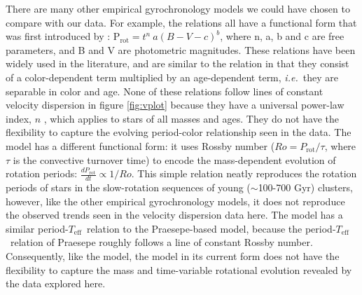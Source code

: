 \documentclass{aastex63}
\newcommand{\ie}{{\it i.e.}}
\newcommand{\teff}{$T_{\mathrm{eff}}$}
\begin{document}
{There are many other empirical gyrochronology models we could have chosen to
compare with our data.
For example, the \citet{barnes2003, barnes2007, mamajek2008, meibom2011,
angus2015} relations all have a functional form that was first introduced by
\citet{barnes2003}: $\mathrm{P_{rot}} = t^n~a(B-V - c)^b$, where n, a, b and c
are free parameters, and B and V are photometric magnitudes.
These relations have been widely used in the literature, and are similar to
the \citet{angus2019} relation in that they consist of a color-dependent term
multiplied by an age-dependent term, \ie\ they are separable in color and age.
None of these relations follow lines of constant velocity dispersion in figure
\ref{fig:vplot} because they have a universal power-law index, $n$
\citep[$\approx$ 0.5,][]{skumanich1972}, which applies to stars of all masses
and ages.
They do not have the flexibility to capture the evolving period-color
relationship seen in the data.
The \citet{barnes2010} model has a different functional form: it uses Rossby
number ($Ro = P_\mathrm{rot}/\tau$, where $\tau$ is the convective turnover
time) to encode the mass-dependent evolution of rotation periods:
$\frac{dP_\mathrm{rot}}{dt} \propto 1/Ro$.
This simple relation neatly reproduces the rotation periods of stars in the
slow-rotation sequences of young ($\sim$100-700 Gyr) clusters, however, like
the other empirical gyrochronology models, it does not reproduce the observed
trends seen in the velocity dispersion data here.
The \citet{barnes2010} model has a similar period-\teff\ relation to the
Praesepe-based \citet{angus2019} model, because the period-\teff\ relation of
Praesepe roughly follows a line of constant Rossby number.
Consequently, like the \citet{angus2019} model, the \citet{barnes2010} model
in its current form does not have the flexibility to capture the mass and
time-variable rotational evolution revealed by the data explored here.


}
\end{document}
